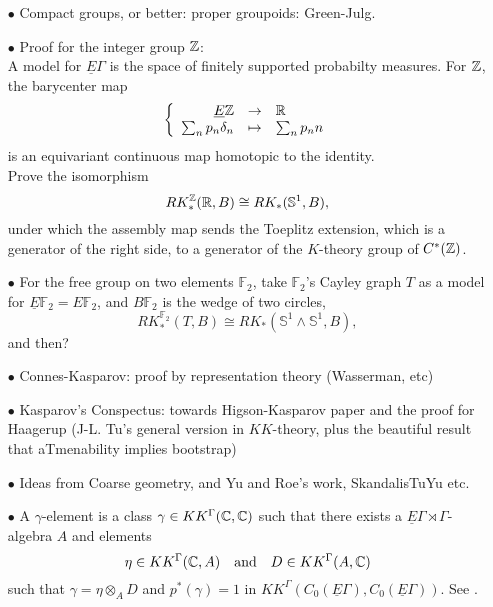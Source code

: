 \begin{itemize}
\item[$\bullet$] Compact groups, or better: proper groupoids: Green-Julg. \\
\item[$\bullet$] Proof for the integer group $\mathbb Z$: \\

A model for $\underline E \Gamma$ is the space of finitely supported probabilty measures. For $\mathbb Z$, the barycenter map 
\[\left\{ \begin{array}{rcl}
\underline E \mathbb Z & \rightarrow & \mathbb R \\ 
\sum_{n} p_n \delta_n & \mapsto & \sum_n p_n n \end{array}\right.\]
is an equivariant continuous map homotopic to the identity.\\

Prove the isomorphism
\[ RK_*^\mathbb Z(\mathbb R, B) \cong RK_*(\mathbb{S}^1,B),\]
under which the assembly map sends the Toeplitz extension, which is a generator of the right side, to a generator of the $K$-theory group of $C^*(\mathbb Z)$.\\

\item[$\bullet$] For the free group on two elements $\mathbb F_2$, take $\mathbb F_2$'s Cayley graph $T$ as a model for $\underline E \mathbb F_2 =E\mathbb F_2$, and $B\mathbb F_2$ is the wedge of two circles,
\[ RK_*^{\mathbb F_2}(T, B) \cong RK_*(\mathbb{S}^1 \wedge \mathbb{S}^1 ,B),\]
and then?\\
	
\item[$\bullet$] Connes-Kasparov: proof by representation theory (Wasserman, etc)\\
\item[$\bullet$] Kasparov's Conspectus: towards Higson-Kasparov paper and the proof for Haagerup (J-L. Tu's general version in $KK$-theory, plus the beautiful result that aTmenability implies bootstrap)\\

\item[$\bullet$] Ideas from Coarse geometry, and Yu and Roe's work, SkandalisTuYu etc.\\

\item[$\bullet$] A $\gamma$-element is a class $\gamma \in KK^\Gamma(\mathbb C,\mathbb C)$ such that there exists a $\underline E \Gamma \rtimes \Gamma$-algebra $A$ and elements 
\[ \eta\in KK^\Gamma(\mathbb C,A) \quad \text{and}\quad D\in KK^\Gamma(A,\mathbb C)\]
such that $\gamma = \eta \otimes_A D$ and $p^*(\gamma)=1$ in $KK^\Gamma(C_0(\underline E\Gamma),C_0(\underline E\Gamma))$. See \cite{TuNovikov}.\\


\end{itemize}
